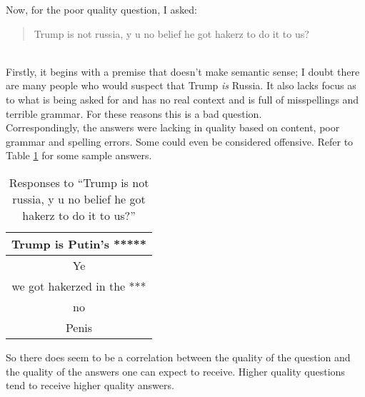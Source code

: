 Now, for the poor quality question, I asked:\\

\blockquote{Trump is not russia, y u no belief he got hakerz to do it to us?}\\

Firstly, it begins with a premise that doesn't make semantic sense; I doubt there are many people who would suspect that Trump \textit{is} Russia.  It also lacks focus as to what is being asked for and has no real context and is full of misspellings and terrible grammar.  For these reasons this is a bad question.\\

Correspondingly, the answers were lacking in quality based on content, poor grammar and spelling errors.  Some could even be considered offensive.  Refer to Table \ref{tab:badq} for some sample answers.

\begin{table}[H]
\centering
\begin{tabular}{ | c | }
\hline
Trump is Putin's *****\\
\hline
Ye\\
\hline
we got hakerzed in the ***\\
\hline
no\\
\hline
Penis\\
\hline
\end{tabular}
\caption{Responses to ``Trump is not russia, y u no belief he got hakerz to do it to us?''}
\label{tab:badq}
\end{table}

So there does seem to be a correlation between the quality of the question and the quality of the answers one can expect to receive.  Higher quality questions tend to receive higher quality answers.
